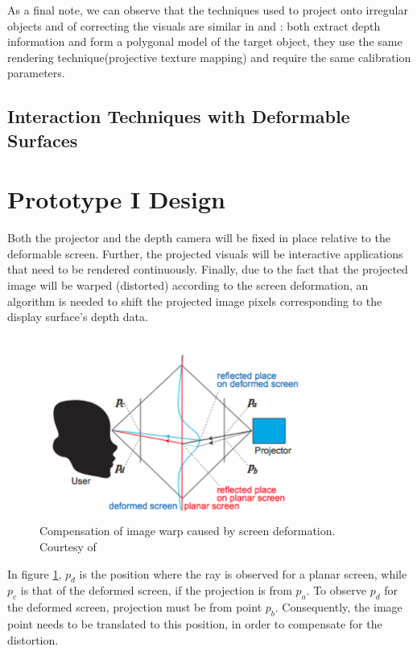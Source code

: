 \documentclass[]{article}
\begin{document}
As a final note, we can observe that the techniques used to project onto irregular objects and of correcting the visuals are similar in \cite{watanabe08} and \cite{raskar98}: both extract depth information and form a polygonal model of the target object, they use the same rendering technique(projective texture mapping) and require the same calibration parameters. 

\subsection{Interaction Techniques with Deformable Surfaces}

\section{Prototype I Design}

Both the projector and the depth camera will be fixed in place relative to the deformable screen. Further, the projected visuals will be interactive applications that need to be rendered continuously. Finally, due to the fact that the projected image will be warped (distorted) according to the screen deformation, an algorithm is needed to shift the projected image pixels corresponding to the display surface’s depth data. 

\begin{figure}[hbtp]
    \centering
    \includegraphics[width=0.8\textwidth]{figures/PointProjection.PNG}
    \caption{Compensation of image warp caused by screen deformation. Courtesy of \cite{watanabe08}}
    \label{fig:PointCompensation}
\end{figure}

In figure \ref{fig:PointCompensation}, $p_{d}$ is the position where the ray is observed for a planar screen, while $p_{c}$ is that of the deformed screen, if the projection is from $p_{a}$. To observe $p_{d}$ for the deformed screen, projection must be from point $p_{b}$. Consequently, the image point needs to be translated to this position, in order to compensate for the distortion.\\
\end{document}
